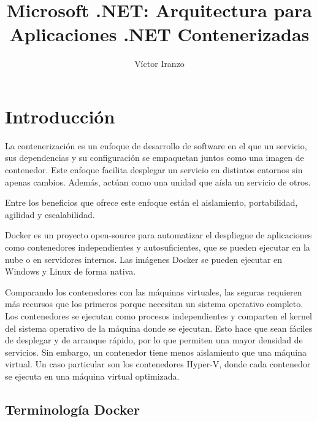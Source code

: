 \documentclass[11pt,a4paper]{article}
\author{Víctor Iranzo}
\title{Microsoft .NET: Arquitectura para Aplicaciones .NET Contenerizadas}
\begin{document}
\maketitle

\section{Introducción}

La contenerización es un enfoque de desarrollo de software en el que un servicio, sus dependencias y su configuración se empaquetan juntos como una imagen de contenedor. Este enfoque facilita desplegar un servicio en distintos entornos sin apenas cambios. Además, actúan como una unidad que aísla un servicio de otros.

Entre los beneficios que ofrece este enfoque están el aislamiento, portabilidad, agilidad y escalabilidad.

Docker es un proyecto open-source para automatizar el despliegue de aplicaciones como contenedores independientes y autosuficientes, que se pueden ejecutar en la nube o en servidores internos. Las imágenes Docker se pueden ejecutar en Windows y Linux de forma nativa.

Comparando los contenedores con las máquinas virtuales, las seguras requieren más recursos que los primeros porque necesitan un sistema operativo completo. Los contenedores se ejecutan como procesos independientes y comparten el kernel del sistema operativo de la máquina donde se ejecutan. Esto hace que sean fáciles de desplegar y de arranque rápido, por lo que permiten una mayor densidad de servicios. Sin embargo, un contenedor tiene menos aislamiento que una máquina virtual. Un caso particular son los contenedores Hyper-V, donde cada contenedor se ejecuta en una máquina virtual optimizada.

\subsection{Terminología Docker}
\end{document}

